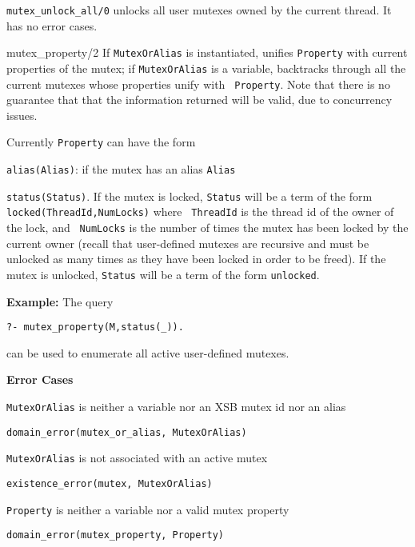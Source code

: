 \begin{description}
%
{\tt mutex\_unlock\_all/0} unlocks all user mutexes owned by the
current thread.  It has no error cases.

{mutex\_property/2}
%
If {\tt MutexOrAlias} is instantiated, unifies {\tt Property} with current
properties of the mutex; if {\tt MutexOrAlias} is a variable, backtracks
through all the current mutexes whose properties unify with {\tt
  Property}.  Note that there is no guarantee that that the
information returned will be valid, due to concurrency issues.

Currently {\tt Property} can have the form 
\bi
\item {\tt alias(Alias)}: if the mutex has an alias {\tt Alias}
%
\item {\tt status(Status)}.  If the mutex is locked, {\tt Status} will
  be a term of the form {\tt locked(ThreadId,NumLocks)} where {\tt
    ThreadId} is the thread id of the owner of the lock, and {\tt
    NumLocks} is the number of times the mutex has been locked by the
  current owner (recall that user-defined mutexes are recursive and
  must be unlocked as many times as they have been locked in order to
  be freed).  If the mutex is unlocked, {\tt Status} will be a term
  of the form {\tt unlocked}.  \ei

{\bf Example:} The query
\begin{verbatim}
?- mutex_property(M,status(_)).
\end{verbatim}
can be used to enumerate all active user-defined mutexes.

{\bf Error Cases}
%
\bi
\item {\tt MutexOrAlias} is neither a variable nor an XSB mutex id
  nor an alias
\bi
\item {\tt domain\_error(mutex\_or\_alias, MutexOrAlias)}
\ei
\item {\tt MutexOrAlias} is not associated with an active mutex
\bi
\item {\tt existence\_error(mutex, MutexOrAlias)}
\ei
\item {\tt Property} is neither a variable nor a valid mutex property
\bi
\item {\tt domain\_error(mutex\_property, Property)}
\ei
\ei

\end{description}


